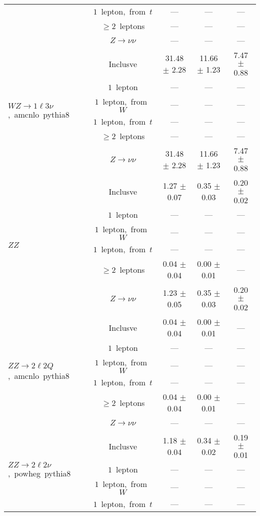 \documentclass{article}
\begin{document}
\begin{longtable}{|l|c|c|c|c|}
 & $1$~lepton,~from~$t$  & ---  & ---  & --- \\* 
 & $\ge2$~leptons  & ---  & ---  & --- \\* 
 & $Z\rightarrow\nu\nu$  & ---  & ---  & --- \\* 
\hline 
\multirow{6}{*}{$WZ{\rightarrow}1{\ell}3{\nu}$,~amcnlo~pythia8} & Inclusve  & 31.48 $\pm$ 2.28  & 11.66 $\pm$ 1.23  & 7.47 $\pm$ 0.88 \\* 
 & $1$~lepton  & ---  & ---  & --- \\* 
 & $1$~lepton,~from~$W$  & ---  & ---  & --- \\* 
 & $1$~lepton,~from~$t$  & ---  & ---  & --- \\* 
 & $\ge2$~leptons  & ---  & ---  & --- \\* 
 & $Z\rightarrow\nu\nu$  & 31.48 $\pm$ 2.28  & 11.66 $\pm$ 1.23  & 7.47 $\pm$ 0.88 \\* 
\hline 
\multirow{6}{*}{$ZZ$} & Inclusve  & 1.27 $\pm$ 0.07  & 0.35 $\pm$ 0.03  & 0.20 $\pm$ 0.02 \\* 
 & $1$~lepton  & ---  & ---  & --- \\* 
 & $1$~lepton,~from~$W$  & ---  & ---  & --- \\* 
 & $1$~lepton,~from~$t$  & ---  & ---  & --- \\* 
 & $\ge2$~leptons  & 0.04 $\pm$ 0.04  & 0.00 $\pm$ 0.01  & --- \\* 
 & $Z\rightarrow\nu\nu$  & 1.23 $\pm$ 0.05  & 0.35 $\pm$ 0.03  & 0.20 $\pm$ 0.02 \\* 
\hline 
\multirow{6}{*}{$ZZ{\rightarrow}2{\ell}2Q$,~amcnlo~pythia8} & Inclusve  & 0.04 $\pm$ 0.04  & 0.00 $\pm$ 0.01  & --- \\* 
 & $1$~lepton  & ---  & ---  & --- \\* 
 & $1$~lepton,~from~$W$  & ---  & ---  & --- \\* 
 & $1$~lepton,~from~$t$  & ---  & ---  & --- \\* 
 & $\ge2$~leptons  & 0.04 $\pm$ 0.04  & 0.00 $\pm$ 0.01  & --- \\* 
 & $Z\rightarrow\nu\nu$  & ---  & ---  & --- \\* 
\hline 
\multirow{6}{*}{$ZZ{\rightarrow}2{\ell}2{\nu}$,~powheg~pythia8} & Inclusve  & 1.18 $\pm$ 0.04  & 0.34 $\pm$ 0.02  & 0.19 $\pm$ 0.01 \\* 
 & $1$~lepton  & ---  & ---  & --- \\* 
 & $1$~lepton,~from~$W$  & ---  & ---  & --- \\* 
 & $1$~lepton,~from~$t$  & ---  & ---  & --- \\* 

\end{longtable}
\end{document}
